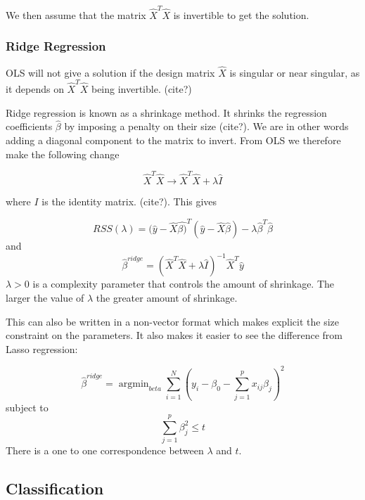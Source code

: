 We then assume that the matrix \(\hat{X}^T\hat{X}\)
is invertible to get the solution. ~\cite{James2000}

\subsubsection{Ridge Regression}\label{section:ridge}
OLS will not give a solution if the design matrix \(\hat{X}\) is singular
or near singular, as it depends on \(\hat{X}^T\hat{X}\) being invertible. (cite?)

Ridge regression is known as a shrinkage method. It shrinks the regression
coefficients \(\hat{\beta}\) by imposing a penalty on their size (cite?). We are in other words adding a diagonal component
to the matrix to invert. From OLS we therefore make the following change

\begin{equation}
	\hat{X}^T\hat{X} \rightarrow \hat{X}^T\hat{X} + \lambda \hat{I}
\end{equation}

where $I$ is the identity matrix. (cite?).
This gives

\begin{equation}
	RSS(\lambda) = (\hat{y}-\hat{X}\hat{\beta)}^T(\hat{y}
	- \hat{X}\hat{\beta})
	- \lambda \hat{\beta}^T\hat{\beta}
\end{equation}
and
\begin{equation}
	\hat{\beta}^{ridge} = (\hat{X}^T\hat{X}
	+ \lambda \hat{I})^{-1}\hat{X}^T\hat{y}
\end{equation}
\(\lambda > 0 \) is a complexity parameter that controls the amount
of shrinkage. The larger the value of \(\lambda\) the greater amount of
shrinkage.
\cite{James2000}

This can also be written in a non-vector format which makes
explicit the size constraint on the parameters.
It also makes it easier to see the difference from Lasso regression:

\begin{equation}
	\hat{\beta}^{ridge} = \operatorname{argmin}_{beta}
							\sum\limits_{i=1}^N \left(y_i - \beta_0
							-\sum\limits_{j=1}^p x_{ij}\beta_j\right)^2
\end{equation}
subject to
\begin{equation}
	\sum\limits_{j=1}^p \beta_j^2 \leq t
\end{equation}
There is a one to one correspondence between \(\lambda\) and \(t\).
\cite{James2000}
\subsection{Classification}
